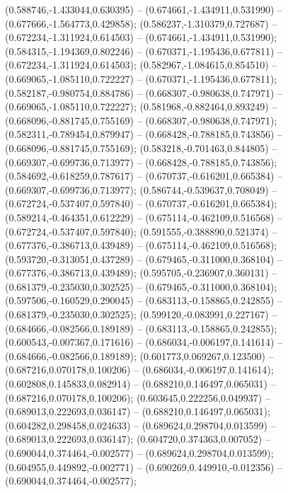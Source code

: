  (0.588746,-1.433044,0.630395) -- (0.674661,-1.434911,0.531990) -- (0.677666,-1.564773,0.429858);
 (0.586237,-1.310379,0.727687) -- (0.672234,-1.311924,0.614503) -- (0.674661,-1.434911,0.531990);
 (0.584315,-1.194369,0.802246) -- (0.670371,-1.195436,0.677811) -- (0.672234,-1.311924,0.614503);
 (0.582967,-1.084615,0.854510) -- (0.669065,-1.085110,0.722227) -- (0.670371,-1.195436,0.677811);
 (0.582187,-0.980754,0.884786) -- (0.668307,-0.980638,0.747971) -- (0.669065,-1.085110,0.722227);
 (0.581968,-0.882464,0.893249) -- (0.668096,-0.881745,0.755169) -- (0.668307,-0.980638,0.747971);
 (0.582311,-0.789454,0.879947) -- (0.668428,-0.788185,0.743856) -- (0.668096,-0.881745,0.755169);
 (0.583218,-0.701463,0.844805) -- (0.669307,-0.699736,0.713977) -- (0.668428,-0.788185,0.743856);
 (0.584692,-0.618259,0.787617) -- (0.670737,-0.616201,0.665384) -- (0.669307,-0.699736,0.713977);
 (0.586744,-0.539637,0.708049) -- (0.672724,-0.537407,0.597840) -- (0.670737,-0.616201,0.665384);
 (0.589214,-0.464351,0.612229) -- (0.675114,-0.462109,0.516568) -- (0.672724,-0.537407,0.597840);
 (0.591555,-0.388890,0.521374) -- (0.677376,-0.386713,0.439489) -- (0.675114,-0.462109,0.516568);
 (0.593720,-0.313051,0.437289) -- (0.679465,-0.311000,0.368104) -- (0.677376,-0.386713,0.439489);
 (0.595705,-0.236907,0.360131) -- (0.681379,-0.235030,0.302525) -- (0.679465,-0.311000,0.368104);
 (0.597506,-0.160529,0.290045) -- (0.683113,-0.158865,0.242855) -- (0.681379,-0.235030,0.302525);
 (0.599120,-0.083991,0.227167) -- (0.684666,-0.082566,0.189189) -- (0.683113,-0.158865,0.242855);
 (0.600543,-0.007367,0.171616) -- (0.686034,-0.006197,0.141614) -- (0.684666,-0.082566,0.189189);
 (0.601773,0.069267,0.123500) -- (0.687216,0.070178,0.100206) -- (0.686034,-0.006197,0.141614);
 (0.602808,0.145833,0.082914) -- (0.688210,0.146497,0.065031) -- (0.687216,0.070178,0.100206);
 (0.603645,0.222256,0.049937) -- (0.689013,0.222693,0.036147) -- (0.688210,0.146497,0.065031);
 (0.604282,0.298458,0.024633) -- (0.689624,0.298704,0.013599) -- (0.689013,0.222693,0.036147);
 (0.604720,0.374363,0.007052) -- (0.690044,0.374464,-0.002577) -- (0.689624,0.298704,0.013599);
 (0.604955,0.449892,-0.002771) -- (0.690269,0.449910,-0.012356) -- (0.690044,0.374464,-0.002577);
